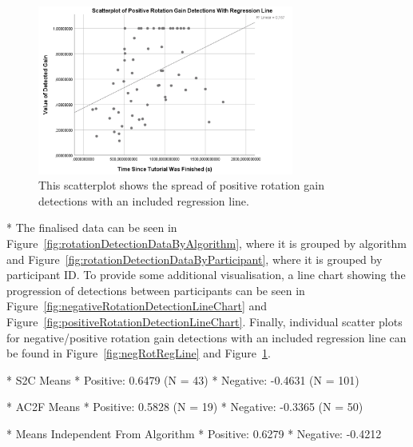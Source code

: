 \begin{figure}[tbph]
    \centering
    \includegraphics[width=0.75\textwidth]{figures/graphs/PosRotDetectionsRegLine.png}
    \caption[Scatterplot For Positive  Rotation Gain Detections Including Regression Line]{This scatterplot shows the spread of positive rotation gain detections with an included regression line.}
    \label{fig:posRotRegLine}
\end{figure}


* The finalised data can be seen in Figure~\ref{fig:rotationDetectionDataByAlgorithm}, where it is grouped by algorithm and Figure~\ref{fig:rotationDetectionDataByParticipant}, where it is grouped by participant ID. To provide some additional visualisation, a line chart showing the progression of detections between participants can be seen in Figure~\ref{fig:negativeRotationDetectionLineChart} and Figure~\ref{fig:positiveRotationDetectionLineChart}. Finally, individual scatter plots for negative/positive rotation gain detections with an included regression line can be found in Figure~\ref{fig:negRotRegLine} and Figure~\ref{fig:posRotRegLine}.

* S2C Means
   * Positive: 0.6479 (N = 43)
   * Negative: -0.4631 (N = 101)

* AC2F Means
   * Positive: 0.5828 (N = 19)
   * Negative: -0.3365 (N = 50)
   
* Means Independent From Algorithm
   * Positive: 0.6279
   * Negative: -0.4212

